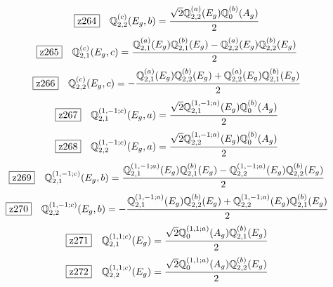 \documentclass[fleqn,10pt,landscape]{jsarticle}
\begin{document}
\begin{dmath*}
\hspace*{3mm}\fbox{z264}\quad \mathbb{Q}_{2,2}^{(c)}(E_{g},b)=\frac{\sqrt{2} \mathbb{Q}_{2,2}^{(a)}(E_{g}) \mathbb{Q}_{0}^{(b)}(A_{g})}{2}
\end{dmath*}
\begin{dmath*}
\hspace*{3mm}\fbox{z265}\quad \mathbb{Q}_{2,1}^{(c)}(E_{g},c)=\frac{\mathbb{Q}_{2,1}^{(a)}(E_{g}) \mathbb{Q}_{2,1}^{(b)}(E_{g}) - \mathbb{Q}_{2,2}^{(a)}(E_{g}) \mathbb{Q}_{2,2}^{(b)}(E_{g})}{2}
\end{dmath*}
\begin{dmath*}
\hspace*{3mm}\fbox{z266}\quad \mathbb{Q}_{2,2}^{(c)}(E_{g},c)=- \frac{\mathbb{Q}_{2,1}^{(a)}(E_{g}) \mathbb{Q}_{2,2}^{(b)}(E_{g}) + \mathbb{Q}_{2,2}^{(a)}(E_{g}) \mathbb{Q}_{2,1}^{(b)}(E_{g})}{2}
\end{dmath*}
\begin{dmath*}
\hspace*{3mm}\fbox{z267}\quad \mathbb{Q}_{2,1}^{(1,-1;c)}(E_{g},a)=\frac{\sqrt{2} \mathbb{Q}_{2,1}^{(1,-1;a)}(E_{g}) \mathbb{Q}_{0}^{(b)}(A_{g})}{2}
\end{dmath*}
\begin{dmath*}
\hspace*{3mm}\fbox{z268}\quad \mathbb{Q}_{2,2}^{(1,-1;c)}(E_{g},a)=\frac{\sqrt{2} \mathbb{Q}_{2,2}^{(1,-1;a)}(E_{g}) \mathbb{Q}_{0}^{(b)}(A_{g})}{2}
\end{dmath*}
\begin{dmath*}
\hspace*{3mm}\fbox{z269}\quad \mathbb{Q}_{2,1}^{(1,-1;c)}(E_{g},b)=\frac{\mathbb{Q}_{2,1}^{(1,-1;a)}(E_{g}) \mathbb{Q}_{2,1}^{(b)}(E_{g}) - \mathbb{Q}_{2,2}^{(1,-1;a)}(E_{g}) \mathbb{Q}_{2,2}^{(b)}(E_{g})}{2}
\end{dmath*}
\begin{dmath*}
\hspace*{3mm}\fbox{z270}\quad \mathbb{Q}_{2,2}^{(1,-1;c)}(E_{g},b)=- \frac{\mathbb{Q}_{2,1}^{(1,-1;a)}(E_{g}) \mathbb{Q}_{2,2}^{(b)}(E_{g}) + \mathbb{Q}_{2,2}^{(1,-1;a)}(E_{g}) \mathbb{Q}_{2,1}^{(b)}(E_{g})}{2}
\end{dmath*}
\begin{dmath*}
\hspace*{3mm}\fbox{z271}\quad \mathbb{Q}_{2,1}^{(1,1;c)}(E_{g})=\frac{\sqrt{2} \mathbb{Q}_{0}^{(1,1;a)}(A_{g}) \mathbb{Q}_{2,1}^{(b)}(E_{g})}{2}
\end{dmath*}
\begin{dmath*}
\hspace*{3mm}\fbox{z272}\quad \mathbb{Q}_{2,2}^{(1,1;c)}(E_{g})=\frac{\sqrt{2} \mathbb{Q}_{0}^{(1,1;a)}(A_{g}) \mathbb{Q}_{2,2}^{(b)}(E_{g})}{2}
\end{dmath*}
\end{document}
